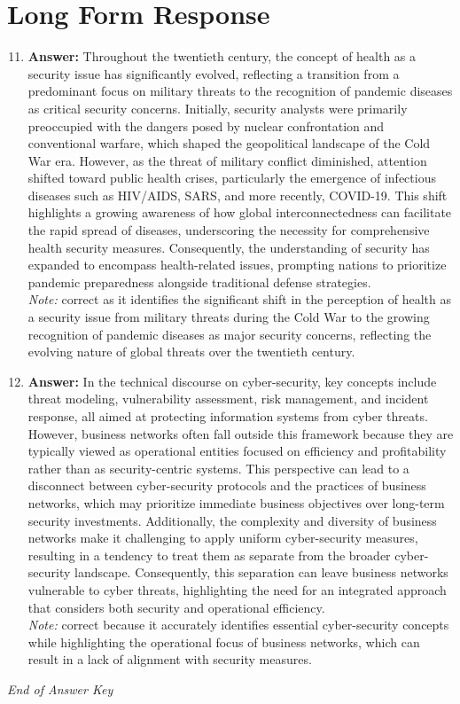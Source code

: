 \documentclass[12pt]{article}
\begin{document}
\section*{Long Form Response}
\begin{enumerate}[label=\arabic*.]
\setcounter{enumi}{10}
\item \textbf{Answer:} Throughout the twentieth century, the concept of health as a security issue has significantly evolved, reflecting a transition from a predominant focus on military threats to the recognition of pandemic diseases as critical security concerns. Initially, security analysts were primarily preoccupied with the dangers posed by nuclear confrontation and conventional warfare, which shaped the geopolitical landscape of the Cold War era. However, as the threat of military conflict diminished, attention shifted toward public health crises, particularly the emergence of infectious diseases such as HIV/AIDS, SARS, and more recently, COVID-19. This shift highlights a growing awareness of how global interconnectedness can facilitate the rapid spread of diseases, underscoring the necessity for comprehensive health security measures. Consequently, the understanding of security has expanded to encompass health-related issues, prompting nations to prioritize pandemic preparedness alongside traditional defense strategies.
\\ \textit{Note:} correct as it identifies the significant shift in the perception of health as a security issue from military threats during the Cold War to the growing recognition of pandemic diseases as major security concerns, reflecting the evolving nature of global threats over the twentieth century.
\item \textbf{Answer:} In the technical discourse on cyber-security, key concepts include threat modeling, vulnerability assessment, risk management, and incident response, all aimed at protecting information systems from cyber threats. However, business networks often fall outside this framework because they are typically viewed as operational entities focused on efficiency and profitability rather than as security-centric systems. This perspective can lead to a disconnect between cyber-security protocols and the practices of business networks, which may prioritize immediate business objectives over long-term security investments. Additionally, the complexity and diversity of business networks make it challenging to apply uniform cyber-security measures, resulting in a tendency to treat them as separate from the broader cyber-security landscape. Consequently, this separation can leave business networks vulnerable to cyber threats, highlighting the need for an integrated approach that considers both security and operational efficiency.
\\ \textit{Note:} correct because it accurately identifies essential cyber-security concepts while highlighting the operational focus of business networks, which can result in a lack of alignment with security measures.
\end{enumerate}

\vfill
\noindent\textit{End of Answer Key}
\end{document}
